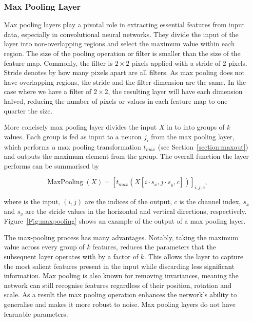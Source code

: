 \subsubsection{Max Pooling Layer}
\label{section:max}

Max pooling layers play a pivotal role in extracting essential features from input data, especially in convolutional neural networks. They divide the input of the layer into non-overlapping regions and select the maximum value within each region. The size of the pooling operation or filter is smaller than the size of the feature map. Commonly, the filter is $2\times 2$ pixels applied with a stride of 2 pixels. Stride denotes by how many pixels apart are all filters. As max pooling does not have overlapping regions, the stride and the filter dimension are the same. In the case where we have a filter of $2\times 2$, the resulting layer will have each dimension halved, reducing the number of pixels or values in each feature map to one quarter the size. 

More concisely max pooling layer divides the input $X$ in to into groups of $k$ values. Each group is fed as input to a neuron $j_i$ from the max pooling layer, which performs a max pooling transformation $t_{max}$ (see Section~\ref{section:maxout}) and outputs the maximum element from the group. The overall function the layer performs can be summarised by 

\begin{equation}
\operatorname{MaxPooling}(X)= [t_{max}(X[i \cdot s_x, j \cdot s_y, c])]_{i,j,c},
\end{equation}

where is the input, $(i,j)$ are the indices of the output, $c$ is the channel index, $s_x$ and $s_y$ are the stride values in the horizontal and vertical directions, respectively. Figure~\ref{Fig:maxpooling} shows an example of the output of a max pooling layer.

The max-pooling process has many advantages. Notably, taking the maximum value across every group of $k$ features, reduces the parameters that the subsequent layer operates with by a factor of $k$. This allows the layer to capture the most salient features present in the input while discarding less significant information. Max pooling is also known for removing invariances, meaning the network can still recognise features regardless of their position, rotation and scale. As a result the max pooling operation enhances the network's ability to generalise and makes it more robust to noise. Max pooling layers do not have learnable parameters.

